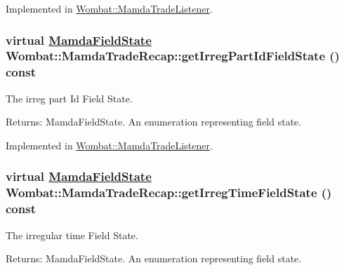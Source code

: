Implemented in \hyperlink{classWombat_1_1MamdaTradeListener_8e6b4c395a5dcebe1439553445f5f374}{Wombat::Mamda\-Trade\-Listener}.\hypertarget{classWombat_1_1MamdaTradeRecap_7279903433d1059bf0fa02ea3af73f2d}{
\subsubsection[getIrregPartIdFieldState]{\setlength{\rightskip}{0pt plus 5cm}virtual \hyperlink{namespaceWombat_93aac974f2ab713554fd12a1fa3b7d2a}{Mamda\-Field\-State} Wombat::Mamda\-Trade\-Recap::get\-Irreg\-Part\-Id\-Field\-State () const}}
\label{classWombat_1_1MamdaTradeRecap_7279903433d1059bf0fa02ea3af73f2d}


The irreg part Id Field State. 

\begin{Desc}
\item[Returns:]Mamda\-Field\-State. An enumeration representing field state. \end{Desc}


Implemented in \hyperlink{classWombat_1_1MamdaTradeListener_c0c46a4f597942f1256906de3aae3c4c}{Wombat::Mamda\-Trade\-Listener}.\hypertarget{classWombat_1_1MamdaTradeRecap_edaa9f3db0011e8175309628b7d17f09}{
\subsubsection[getIrregTimeFieldState]{\setlength{\rightskip}{0pt plus 5cm}virtual \hyperlink{namespaceWombat_93aac974f2ab713554fd12a1fa3b7d2a}{Mamda\-Field\-State} Wombat::Mamda\-Trade\-Recap::get\-Irreg\-Time\-Field\-State () const}}
\label{classWombat_1_1MamdaTradeRecap_edaa9f3db0011e8175309628b7d17f09}


The irregular time Field State. 

\begin{Desc}
\item[Returns:]Mamda\-Field\-State. An enumeration representing field state. \end{Desc}


